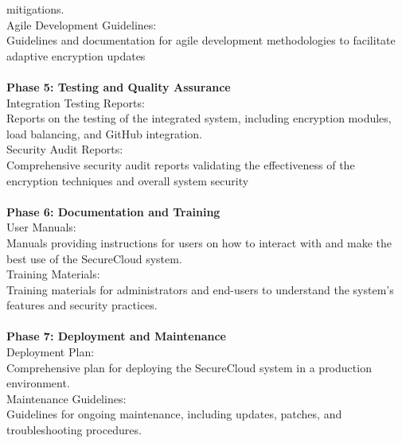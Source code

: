 mitigations.\\
Agile Development Guidelines:\\
Guidelines and documentation for agile development methodologies to facilitate adaptive encryption
updates
\\
\\
\textbf{Phase 5: Testing and Quality Assurance}\\
Integration Testing Reports:\\
Reports on the testing of the integrated system, including encryption modules, load balancing, and
GitHub integration.\\
Security Audit Reports:\\
Comprehensive security audit reports validating the effectiveness of the encryption techniques and
overall system security
\\
\\
\textbf{Phase 6: Documentation and Training }\\
User Manuals:\\
Manuals providing instructions for users on how to interact with and make the best use of the
SecureCloud system.\\
Training Materials:\\
Training materials for administrators and end-users to understand the system's features and security
practices.
\\
\\
\textbf{Phase 7: Deployment and Maintenance }\\
Deployment Plan:\\
Comprehensive plan for deploying the SecureCloud system in a production environment.\\
Maintenance Guidelines:\\
Guidelines for ongoing maintenance, including updates, patches, and troubleshooting procedures.

\newpage
